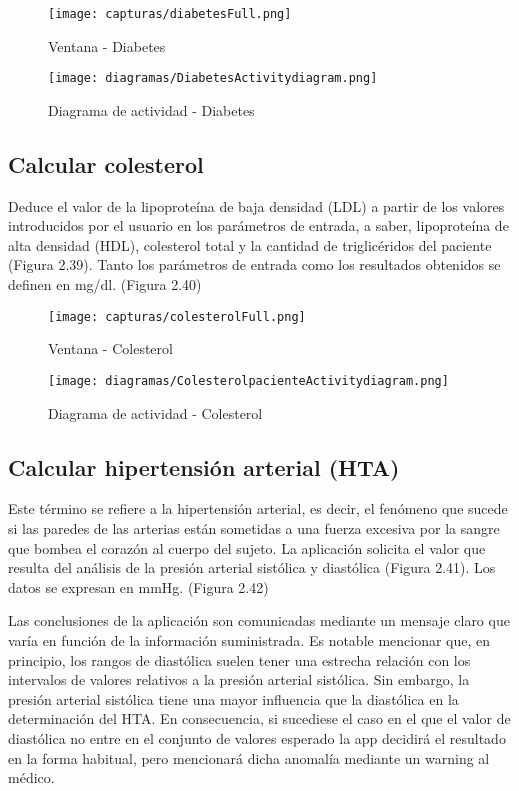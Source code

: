 \documentclass[11pt,spanish,
		listoftables,listoffigures]
		{tfgplantilla}
\begin{document}
\begin{figure}[H]
\centering
\texttt{[image: capturas/diabetesFull.png]}
\caption{Ventana - Diabetes}
\end{figure}

\begin{figure}[H]
\centering
\texttt{[image: diagramas/DiabetesActivitydiagram.png]}
\caption{Diagrama de actividad - Diabetes}
\end{figure}

\subsection {Calcular colesterol}

Deduce el valor de la lipoproteína de baja densidad (LDL) a partir de los valores introducidos por el usuario en los parámetros de entrada, a saber, lipoproteína de alta densidad (HDL), colesterol total y la cantidad de triglicéridos del paciente (Figura 2.39).
Tanto los parámetros de entrada como los resultados obtenidos se definen en mg/dl. (Figura 2.40)

\begin{figure}[H]
\centering
\texttt{[image: capturas/colesterolFull.png]}
\caption{Ventana - Colesterol}
\end{figure}

\begin{figure}[H]
\centering
\texttt{[image: diagramas/ColesterolpacienteActivitydiagram.png]}
\caption{Diagrama de actividad - Colesterol}
\end{figure}

\subsection {Calcular hipertensión arterial (HTA)}

Este término se refiere a la hipertensión arterial, es decir, el fenómeno que sucede si las paredes de las arterias están sometidas a una fuerza excesiva por la sangre que bombea el corazón al cuerpo del sujeto.
La aplicación solicita el valor que resulta del análisis de la presión arterial sistólica y diastólica (Figura 2.41). Los datos se expresan en mmHg. (Figura 2.42)

Las conclusiones de la aplicación son comunicadas mediante un mensaje claro que varía en función de la información suministrada.
Es notable mencionar que, en principio, los rangos de diastólica suelen tener una estrecha relación con los intervalos de valores relativos a la presión arterial sistólica. Sin embargo, la presión arterial sistólica tiene una mayor influencia que la diastólica en la determinación del HTA. En consecuencia, si sucediese el caso en el que el valor de diastólica no entre en el conjunto de valores esperado la app decidirá el resultado en la forma habitual, pero mencionará dicha anomalía mediante un warning al médico.
\end{document}

